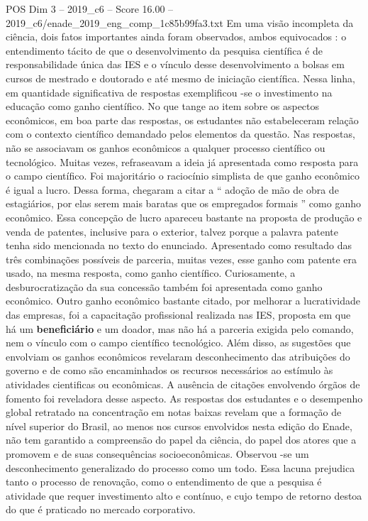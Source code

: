 \begin{textsample}{POS Dim 3 – 2019\_c6 – Score 16.00 – 2019\_c6/enade\_2019\_eng\_comp\_1c85b99fa3.txt}
Em uma visão incompleta da ciência, dois fatos importantes ainda foram observados, ambos equivocados : o entendimento tácito de que o desenvolvimento da pesquisa científica é de responsabilidade única das IES e o vínculo desse desenvolvimento a bolsas em cursos de mestrado e doutorado e até mesmo de iniciação científica.
Nessa linha, em quantidade significativa de respostas exemplificou -se o investimento na educação como ganho científico.
No que tange ao item sobre os aspectos econômicos, em boa parte das respostas, os estudantes não estabeleceram relação com o contexto científico demandado pelos elementos da questão.
Nas respostas, não se associavam os ganhos econômicos a qualquer processo científico ou tecnológico.
Muitas vezes, refraseavam a ideia já apresentada como resposta para o campo científico.
Foi majoritário o raciocínio simplista de que ganho econômico é igual a lucro.
Dessa forma, chegaram a citar a “ adoção de mão de obra de estagiários, por elas serem mais baratas que os empregados formais ” como ganho econômico.
Essa concepção de lucro apareceu bastante na proposta de produção e venda de patentes, inclusive para o exterior, talvez porque a palavra patente tenha sido mencionada no texto do enunciado.
Apresentado como resultado das três combinações possíveis de parceria, muitas vezes, esse ganho com patente era usado, na mesma resposta, como ganho científico.
Curiosamente, a desburocratização da sua concessão também foi apresentada como ganho econômico.
Outro ganho econômico bastante citado, por melhorar a lucratividade das empresas, foi a capacitação profissional realizada nas IES, proposta em que há um \textbf{beneficiário} e um doador, mas não há a parceria exigida pelo comando, nem o vínculo com o campo científico tecnológico.
Além disso, as sugestões que envolviam os ganhos econômicos revelaram desconhecimento das atribuições do governo e de como são encaminhados os recursos necessários ao estímulo às atividades cientificas ou econômicas.
A ausência de citações envolvendo órgãos de fomento foi reveladora desse aspecto.
As respostas dos estudantes e o desempenho global retratado na concentração em notas baixas revelam que a formação de nível superior do Brasil, ao menos nos cursos envolvidos nesta edição do Enade, não tem garantido a compreensão do papel da ciência, do papel dos atores que a promovem e de suas consequências socioeconômicas.
Observou -se um desconhecimento generalizado do processo como um todo.
Essa lacuna prejudica tanto o processo de renovação, como o entendimento de que a pesquisa é atividade que requer investimento alto e contínuo, e cujo tempo de retorno destoa do que é praticado no mercado corporativo.

\end{textsample}
